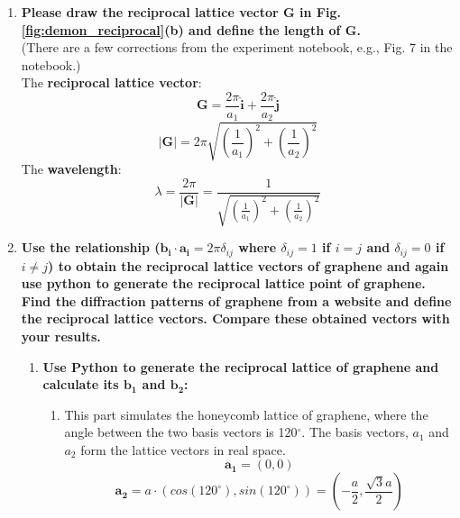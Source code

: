 \documentclass[12pt,a4paper]{article}
\begin{document}
\begin{CJK}{UTF8}{bkai}
\begin{enumerate}
    \item \textbf{Please draw the reciprocal lattice vector G in Fig.\ref{fig:demon_reciprocal}(b) and define the length of G.}\\
    (There are a few corrections from the experiment notebook, e.g., Fig. 7 in the notebook.)\\   
    The \textbf{reciprocal lattice vector}:
    \begin{equation}
        \mathbf{G} = \frac{2\pi}{a_1}\mathbf{\hat{i}}+\frac{2\pi}{a_2}\mathbf{\hat{j}}
    \end{equation}
    \begin{equation}
        |\mathbf{G}| = 2\pi \sqrt{\left(\frac{1}{a_1}\right)^2+\left(\frac{1}{a_2}\right)^2}
    \end{equation}
    The \textbf{wavelength}:
    \begin{equation}
        \lambda = \frac{2\pi}{|\mathbf{G}|} = \frac{1}{\sqrt{\left(\frac{1}{a_1}\right)^2+\left(\frac{1}{a_2}\right)^2}}
    \end{equation}
    \item \textbf{Use the relationship ($\mathbf{b_i \cdot a_i} =2\pi \delta_{ij}$ where $\delta_{ij}=1$ if $i=j$ and $\delta_{ij}=0$ if $i\neq j$) to obtain the reciprocal lattice vectors of graphene and again use python to generate the reciprocal lattice point of graphene. Find the diffraction patterns of graphene from a website and define the reciprocal lattice vectors. Compare these obtained vectors with your results.}
    \begin{enumerate}
        \item \textbf{Use Python to generate the reciprocal lattice of graphene and calculate its $\mathbf{b_1}$ and $\mathbf{b_2}$:}
        \begin{enumerate}
            \item This part simulates the honeycomb lattice of graphene, where the angle between the two basis vectors is 120$^{\circ}$. The basis vectors, $a_1$ and $a_2$ form the lattice vectors in real space.
            \begin{equation}
                \mathbf{a_1} = \left(0, 0\right)
            \end{equation}
            \begin{equation}
                \mathbf{a_2} = a\cdot\left(cos(120^\circ), sin(120^\circ)\right) = \left(-\frac{a}{2}, \frac{\sqrt{3}a}{2}\right)
            \end{equation}

\end{enumerate}
\end{enumerate}
\end{enumerate}
\end{CJK}
\end{document}

